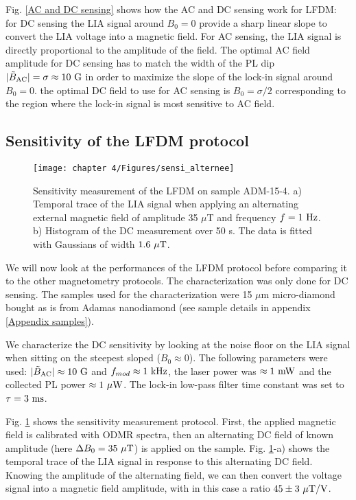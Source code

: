 \documentclass[a4paper, 11pt]{report}
\begin{document}
Fig. \ref{AC and DC sensing} shows how the AC and DC sensing work for LFDM: for DC sensing the LIA signal around $B_0=0$ provide a sharp linear slope to convert the LIA voltage into a magnetic field. For AC sensing, the LIA signal is directly proportional to the amplitude of the field. The optimal AC field amplitude for DC sensing has to match the width of the PL dip $|\tilde{B}_{\rm AC}| = \sigma \approx 10\ \rm G$ in order to maximize the slope of the lock-in signal around $B_0=0$. the optimal DC field to use for AC sensing is $B_0= \sigma/2$ corresponding to the region where the lock-in signal is most sensitive to AC field. 

\subsection{Sensitivity of the LFDM protocol}
\begin{figure}[h!]
\centering
\texttt{[image: chapter 4/Figures/sensi\_alternee]}
\caption{Sensitivity measurement of the LFDM on sample ADM-15-4. a) Temporal trace of the LIA signal when applying an alternating external magnetic field of amplitude 35 $\mu$T and frequency $f=1\ \rm Hz$. b) Histogram of the DC measurement over 50 s. The data is fitted with Gaussians of width $1.6\ \rm{\mu T}$.}
\label{sensei alternee}
\end{figure}

We will now look at the performances of the LFDM protocol before comparing it to the other magnetometry protocols. The characterization was only done for DC sensing. The samples used for the characterization were 15 $\mu$m micro-diamond bought as is from Adamas nanodiamond (see sample details in appendix \ref{Appendix samples}).

We characterize the DC sensitivity by looking at the noise floor on the LIA signal when sitting on the steepest sloped ($B_0\approx 0$). The following parameters were used: $|\tilde{B}_{\rm AC}|\approx 10\ \rm G$ and $f_{mod} \approx 1\ \rm kHz$, the laser power was $\approx 1\ \rm mW$ and the collected PL power $\approx 1\ \rm{\mu W}$. The lock-in low-pass filter time constant was set to $\tau=3\ \rm ms$.

Fig. \ref{sensei alternee} shows the sensitivity measurement protocol. First, the applied magnetic field is calibrated with ODMR spectra, then an alternating DC field of known amplitude (here $\Delta B_0=35\ \rm{\mu T}$) is applied on the sample. Fig. \ref{sensei alternee}-a) shows the temporal trace of the LIA signal in response to this alternating DC field. Knowing the amplitude of the alternating field, we can then convert the voltage signal into a magnetic field amplitude, with in this case a ratio $45 \pm 3\ \rm{\mu T /V}$.
\end{document}
